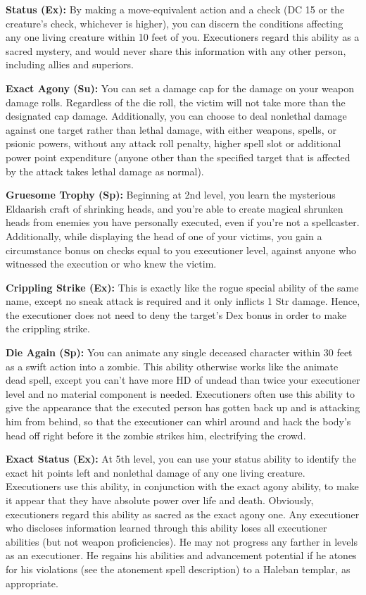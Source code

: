 \textbf{Status (Ex):} By making a move-equivalent action and a  check (DC 15 or the creature’s  check, whichever is higher), you can discern the conditions affecting any one living creature within 10 feet of you. Executioners regard this ability as a sacred mystery, and would never share this information with any other person, including allies and superiors.

\textbf{Exact Agony (Su):} You can set a damage cap for the damage on your weapon damage rolls. Regardless of the die roll, the victim will not take more than the designated cap damage. Additionally, you can choose to deal nonlethal damage against one target rather than lethal damage, with either weapons, spells, or psionic powers, without any attack roll penalty, higher spell slot or additional power point expenditure (anyone other than the specified target that is affected by the attack takes lethal damage as normal).

\textbf{Gruesome Trophy (Sp):} Beginning at 2nd level, you learn the mysterious Eldaarish craft of shrinking heads, and you’re able to create magical shrunken heads from enemies you have personally executed, even if you’re not  a spellcaster. Additionally, while displaying the head of one of your victims, you gain a circumstance bonus on  checks equal to you executioner level, against anyone who witnessed the execution or who knew the victim.

\textbf{Crippling Strike (Ex):} This is exactly like the rogue special ability of the same name, except no sneak attack is required and it only inflicts 1 Str damage. Hence, the executioner does not need to deny the target’s Dex bonus in order to make the crippling strike.

\textbf{Die Again (Sp):} You can animate any single deceased character within 30 feet as a swift action into a zombie. This ability otherwise works like the animate dead spell, except you can’t have more HD of undead than twice your executioner level and no material component is needed. Executioners often use this ability to give the appearance that the executed person has gotten back up and is attacking him from behind, so that the executioner can whirl around and hack the body’s head off right  before it the zombie strikes him, electrifying the crowd.

\textbf{Exact Status (Ex):} At 5th level, you can use your status ability to identify the exact hit points left and nonlethal damage of any one living creature. Executioners use this ability, in conjunction with the exact agony ability, to make it appear that they have absolute power over life and death. Obviously, executioners regard this ability as sacred as the exact agony one. Any executioner who discloses information learned through this ability loses all executioner abilities (but not weapon proficiencies). He may not progress any farther in levels as an executioner. He regains his abilities and advancement potential if he atones for his violations (see the atonement spell description) to a Haleban templar, as appropriate.

